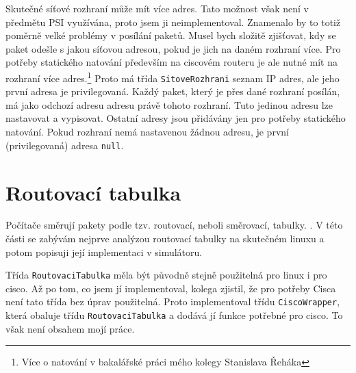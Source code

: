 Skutečné síťové rozhraní může mít více adres. Tato možnost však není v předmětu PSI využívána, proto jsem ji neimplementoval. Znamenalo by to totiž poměrně velké problémy v posílání paketů. Musel bych složitě zjišťovat, kdy se paket odešle s jakou síťovou adresou, pokud je jich na daném rozhraní více. Pro potřeby statického natování především na ciscovém routeru je ale nutné mít na rozhraní více adres.\footnote{Více o natování v bakalářské práci mého kolegy Stanislava Řeháka} Proto má třída \verb|SitoveRozhrani| seznam IP adres, ale jeho první adresa je privilegovaná. Každý paket, který je přes dané rozhraní posílán, má jako odchozí adresu adresu právě tohoto rozhraní. Tuto jedinou adresu lze nastavovat a vypisovat. Ostatní adresy jsou přidávány jen pro potřeby statického natování. Pokud rozhraní nemá nastavenou žádnou adresu, je první (privilegovaná) adresa \verb|null|.




\section{Routovací tabulka}


Počítače směrují pakety podle tzv. routovací, neboli směrovací, tabulky. \cite{owebu:routovaci_tabulka}. V této části se zabývám nejprve analýzou routovací tabulky na skutečném linuxu a potom popisuji její implementaci v simulátoru.

Třída \verb|RoutovaciTabulka| měla být původně stejně použitelná pro linux i pro cisco. Až po tom, co jsem jí implementoval, kolega zjistil, že pro potřeby Cisca není tato třída bez úprav použitelná. Proto implementoval třídu \verb|CiscoWrapper|, která obaluje třídu \verb|RoutovaciTabulka| a dodává jí funkce potřebné pro cisco. To však není obsahem mojí práce.


